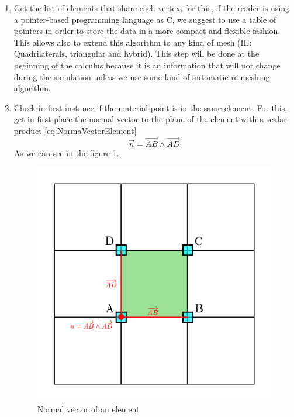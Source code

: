 \begin{enumerate}
\item Get the list of elements that share each vertex, for this, if the
  reader is using a pointer-based programming language as C, we suggest to
  use a table of pointers in order to store the data in a more compact
  and flexible fashion. This allows also to extend this algorithm to
  any kind of mesh (IE: Quadrilaterals, triangular and hybrid). This
  step will be done at the beginning of the calculus because it is an
  information that will not change during the simulation unless we
  use some kind of automatic re-meshing algorithm.  
\item Check in first instance if the material point is in the same
  element. For this, get in first place the normal vector to the plane
  of the element with a scalar product \eqref{eq:NormaVectorElement}
  \begin{equation}
    \label{eq:NormaVectorElement}
    \overrightarrow{n} = \overrightarrow{AB} \wedge \overrightarrow{AD}
  \end{equation}
  As we can see in the figure \ref{fig:NormalVector}.
  \begin{figure}
    \centering
    \includegraphics[scale=0.5]{./SECTIONS/TEX/ALGORITHMS/FIGURES/NormalVector}    
    \caption{Normal vector of an element}
    \label{fig:NormalVector}

\end{figure}
\end{enumerate}
